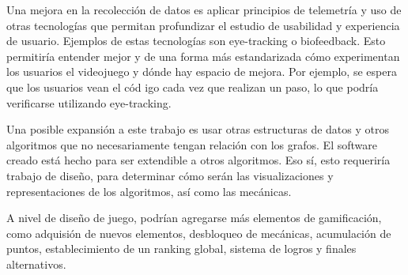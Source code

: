 Una mejora en la recolección de datos es aplicar principios de telemetría y uso de otras tecnologías que permitan profundizar el estudio de usabilidad y experiencia de usuario. Ejemplos de estas tecnologías son eye-tracking o biofeedback. Esto permitiría entender mejor y de una forma más estandarizada cómo experimentan los usuarios el videojuego y dónde hay espacio de mejora. Por ejemplo, se espera que los usuarios vean el cód igo cada vez que realizan un paso, lo que podría verificarse utilizando eye-tracking. 

Una posible expansión a este trabajo es usar otras estructuras de datos y otros algoritmos que no necesariamente tengan relación con los grafos. El software creado está hecho para ser extendible a otros algoritmos. Eso sí, esto requeriría trabajo de diseño, para determinar cómo serán las visualizaciones y representaciones de los algoritmos, así como las mecánicas.

A nivel de diseño de juego, podrían agregarse más elementos de gamificación, como adquisión de nuevos elementos, desbloqueo de mecánicas, acumulación de puntos, establecimiento de un ranking global, sistema de logros y finales alternativos.
